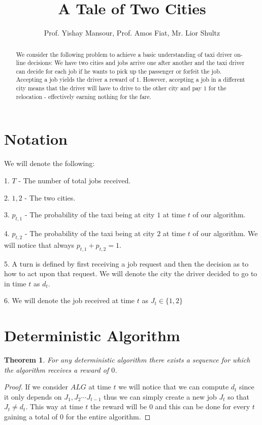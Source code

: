 \documentclass[]{article}
\title{A Tale of Two Cities}
\author{Prof. Yishay Mansour, Prof. Amos Fiat, Mr. Lior Shultz}
\newtheorem{theorem}{Theorem}
\begin{document}
\maketitle

\begin{abstract}

We consider the following problem to achieve a basic understanding of taxi driver on-line decisions:
	We have two cities and jobs arrive one after another and the taxi driver can decide for each job if he wants to pick up the passenger or forfeit the job.
	Accepting a job yields the driver a reward of $ 1 $. However, accepting a job in a different city means that the driver will have to drive to the other city and pay $ 1 $ for the relocation - effectively earning nothing for the fare.

\end{abstract}

\section{Notation}

We will denote the following:

1. $ T $ - The number of total jobs received.

2. $ 1 , 2 $ - The two cities.

3. $ p_{t,1} $ - The probability of the taxi being at city $ 1 $ at time $ t $ of our algorithm.

4. $ p_{t,2} $ - The probability of the taxi being at city $ 2 $ at time $ t $ of our algorithm. We will notice that always $ p_{t,1} + p_{t,2} = 1 $.

5. A turn is defined by first receiving a job request and then the decision as to how to act upon that request. We will denote the city the driver decided to go to in time $ t $ as $ d_t $.

6. We will denote the job received at time $ t $ as $ J_t \in \{1,2\} $ 

\section{Deterministic Algorithm}

\begin{theorem}
		For any deterministic algorithm there exists a sequence for which the algorithm receives a reward of $ 0 $.
\end{theorem}

\begin{proof}
	If we consider $ ALG $ at time $ t $ we will notice that we can compute $ d_t $ since it only depends on $ J_1,J_2 \cdots J_{t-1} $ thus we can simply create a new job $ J_t $ so that $ J_t \neq d_t $. This way at time $ t $ the reward will be $ 0 $ and this can be done for every $ t $ gaining a total of $ 0 $ for the entire algorithm.
\end{proof}
\end{document}
